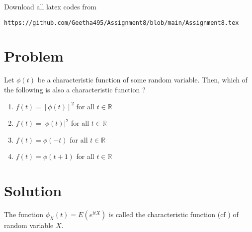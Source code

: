 \documentclass[journal,12pt,twocolumn]{IEEEtran}
\begin{document}
Download all latex codes from 
\begin{lstlisting}
https://github.com/Geetha495/Assignment8/blob/main/Assignment8.tex
\end{lstlisting}
\section{Problem}
Let $\phi(t)$ be a characteristic function of some random variable.  Then, which of the following is also a characteristic function ?
\begin{enumerate}
    \item $f(t) = [\phi(t)]^2$ for all $t \in \mathbb{R}$
    \item $f(t) = |\phi(t)|^2$ for all $t \in \mathbb{R}$
    \item $f(t) = \phi(-t)$ for all $t \in \mathbb{R}$
    \item $f(t) = \phi(t+1)$ for all $t \in \mathbb{R}$
\end{enumerate}
\section{Solution}
\begin{definition}
 The function $\phi_X(t) = E(e^{itX})$ is called the characteristic function (cf ) of random variable $X$.
 \label{def:characterstic_function}
\end{definition}
\end{document}

